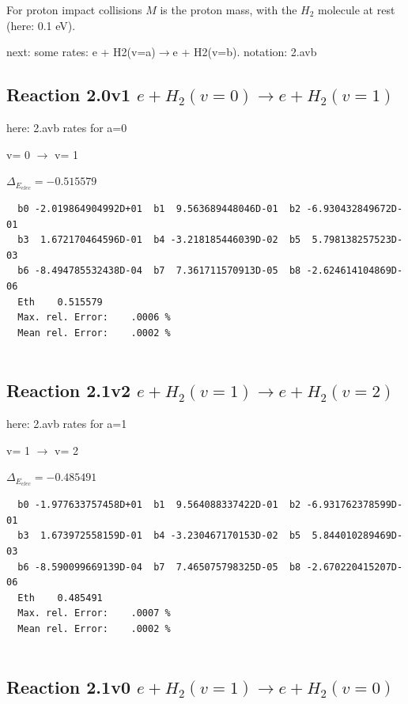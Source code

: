 \documentclass[12pt,dvipdfmx]{article}
\begin{document}
For proton impact collisions $M$ is the proton mass, with the $H_2$ molecule at rest (here: 0.1 eV).


next:
some rates: e + H2(v=a)$\rightarrow$e + H2(v=b). notation: 2.avb

\subsection{
Reaction 2.0v1
$ e + H_2(v=0) \rightarrow e + H_2(v=1) $
}
here: 2.avb rates for a=0

v=  0 $\rightarrow$ v= 1

$\Delta_{E_{elec}}=-0.515579$

\begin{small}\begin{verbatim}
  b0 -2.019864904992D+01  b1  9.563689448046D-01  b2 -6.930432849672D-01
  b3  1.672170464596D-01  b4 -3.218185446039D-02  b5  5.798138257523D-03
  b6 -8.494785532438D-04  b7  7.361711570913D-05  b8 -2.624614104869D-06
  Eth    0.515579
  Max. rel. Error:    .0006 %
  Mean rel. Error:    .0002 %


\end{verbatim}\end{small}

\newpage

\subsection{
Reaction 2.1v2
$ e + H_2(v=1) \rightarrow e + H_2(v=2) $
}

here: 2.avb rates for a=1

  v=  1 $\rightarrow$ v= 2

$\Delta_{E_{elec}}=-0.485491$



\begin{small}\begin{verbatim}
  b0 -1.977633757458D+01  b1  9.564088337422D-01  b2 -6.931762378599D-01
  b3  1.673972558159D-01  b4 -3.230467170153D-02  b5  5.844010289469D-03
  b6 -8.590099669139D-04  b7  7.465075798325D-05  b8 -2.670220415207D-06
  Eth    0.485491
  Max. rel. Error:    .0007 %
  Mean rel. Error:    .0002 %


\end{verbatim}\end{small}

\subsection{
Reaction 2.1v0
$ e + H_2(v=1) \rightarrow e + H_2(v=0) $
}
\end{document}
